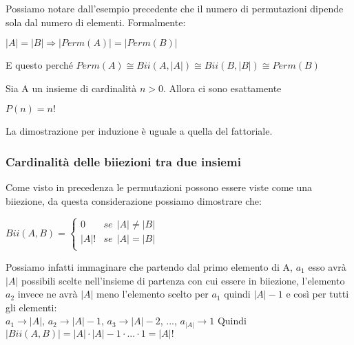 \begin{note}
Possiamo notare dall'esempio precedente che il numero di permutazioni dipende sola dal numero di elementi. Formalmente:
\begin{center}\vspace{-5pt}
    $|A| = |B| \Longrightarrow |Perm(A)| = |Perm(B)|$
\end{center}
E questo perché $Perm(A) \cong Bii(A,|A|) \cong Bii(B,|B|) \cong Perm(B)$
\end{note}

\begin{proposition}
Sia A un insieme di cardinalità $n > 0$. Allora ci sono esattamente
\begin{center}
    $P(n) = n!$
\end{center}
\end{proposition}
\hspace{-15pt}La dimostrazione per induzione è uguale a quella del fattoriale.

\subsubsection{Cardinalità delle biiezioni tra due insiemi}
Come visto in precedenza le permutazioni possono essere viste come una biiezione, da questa considerazione possiamo dimostrare che:
\begin{center}
    $Bii(A,B) = \begin{cases}
        0 & se \:\: |A| \neq |B|\\
        |A|! & se \:\: |A| = |B|\\
    \end{cases}$
\end{center}
Possiamo infatti immaginare che partendo dal primo elemento di A, $a_1$ esso avrà $|A|$ possibili scelte nell'insieme di partenza con cui essere in biiezione, l'elemento $a_2$ invece ne avrà $|A|$ meno l'elemento scelto per $a_1$ quindi $|A|-1$ e così per tutti gli elementi:\\
$a_1 \to |A|$, $a_2 \to |A| - 1$, $a_3 \to |A| - 2$, ..., $a_{|A|} \to 1$ \hspace{.5cm} Quindi $|Bii(A,B)| = |A| \cdot |A|-1 \cdot ... \cdot 1 = |A|!$

